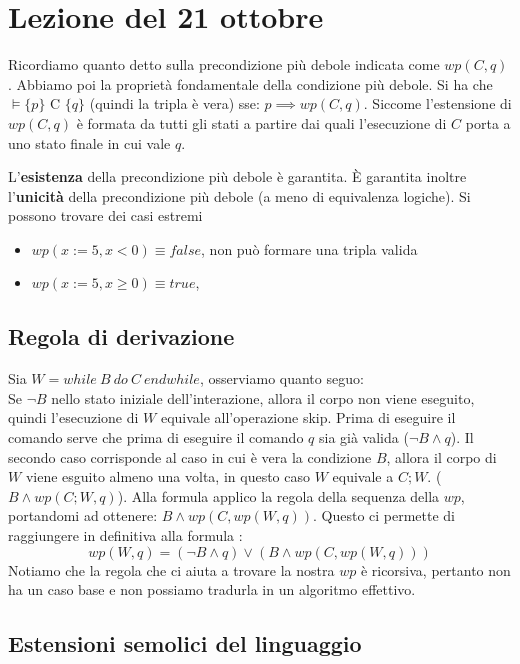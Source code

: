 \section{Lezione del 21 ottobre}
Ricordiamo quanto detto sulla precondizione più debole indicata come $wp(C, q)$. Abbiamo poi la proprietà fondamentale della condizione più debole. Si ha che $\vDash\{p\}\mbox{ C }\{q\}$ (quindi la tripla è vera) sse: $p\implies wp(C,q)$. Siccome l'estensione di $wp(C, q)$ è formata da tutti gli stati a partire dai quali l'esecuzione di $C$ porta a uno stato finale in cui vale $q$.

L'\textbf{esistenza} della precondizione più debole è garantita. È garantita inoltre l'\textbf{unicità} della precondizione più debole (a meno di equivalenza logiche).
Si possono trovare dei casi estremi \begin{itemize}
    \item $wp(x:=5, x<0) \equiv false$, non può formare una tripla valida
    \item $wp(x:=5, x \geq 0) \equiv true$, 
\end{itemize} 

\subsection{Regola di derivazione}
Sia $W = while \ B \ do \ C \ endwhile $, osserviamo quanto seguo:\\
Se $\neg B$ nello stato iniziale dell'interazione, allora il corpo non viene eseguito, quindi l'esecuzione di $W$ equivale all'operazione skip. Prima di eseguire il comando serve che prima di eseguire il comando $q$ sia già valida ($\neg B \land q$). Il secondo caso corrisponde al caso in cui è vera la condizione $B$, allora il corpo di $W$ viene esguito almeno una volta, in questo caso $W$ equivale a $C;W$. ($B \land wp(C;W, q)$). Alla formula applico la regola della sequenza della $wp$, portandomi ad ottenere: $B \land wp(C, wp(W, q))$. Questo ci permette di raggiungere in definitiva alla formula :
$$ wp(W,q) = (\neg B \land q) \lor  (B \land wp(C, wp(W, q)))$$
Notiamo che la regola che ci aiuta a trovare la nostra $wp$ è ricorsiva, pertanto non ha un caso base e non possiamo tradurla in un algoritmo effettivo.

\subsection{Estensioni semolici del linguaggio}

